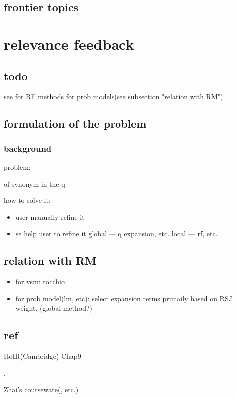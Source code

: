 \documentclass[•]{article}
\begin{document}
\subsection{frontier topics}

\section{relevance feedback}

\subsection{todo}
see \cite{Lv2011} for RF methods for prob models(see subsection "relation with RM")

\subsection{formulation of the problem}
\subsubsection{background}
problem:

of synonym in the q

how to solve it:

\begin{itemize}
\item user manually refine it
\item se help user to refine it
\subitem global --- q expansion, etc.
\subitem local --- rf, etc.
\end{itemize}


\subsection{relation with RM}
\cite{Lv2011}
\begin{itemize}
\item for vsm:
rocchio
\item for prob model(lm, etc):
select expansion terms primaily based on RSJ weight. (global method?)
\end{itemize}
\subsection{ref}
ItoIR(Cambridge) Chap9

\cite{Lv2011}, \cite{Zhai2001}

Zhai's courseware(\cite{CS598CXZreadings}, etc.)
\end{document}

